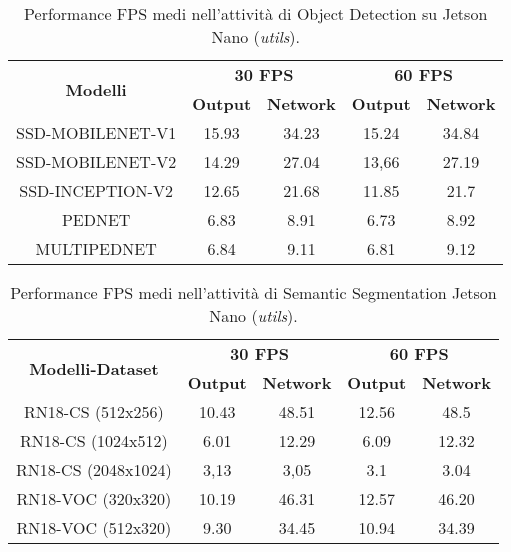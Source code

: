 \begin{table}
    \renewcommand{\baselinestretch}{1}
    \centering
    \begin{adjustbox}{max width=\textwidth}
    \begin{tabular}{|c||c|c||c|c||}
        \hline
        \multirow{2}{*}{\bfseries{\Large Modelli}} & \multicolumn{2}{c||}{\bfseries{30 FPS}} & \multicolumn{2}{c||}{\bfseries{60 FPS}}\\            & \bfseries{Output} & \bfseries{Network} & \bfseries{Output} & \bfseries{Network}\\
        \hline
        \hline
        SSD-MOBILENET-V1 & 15.93 & 34.23 & 15.24 & 34.84\\
        \hline
        SSD-MOBILENET-V2 & 14.29 & 27.04 & 13,66 & 27.19\\
        \hline 
        SSD-INCEPTION-V2 & 12.65 & 21.68 & 11.85 & 21.7\\
        \hline
        PEDNET & 6.83 &  8.91 & 6.73 & 8.92\\
        \hline
        MULTIPEDNET & 6.84 & 9.11 & 6.81 & 9.12\\
        \hline
    \end{tabular}
    \end{adjustbox}
    \vspace{0.5cm}
    \caption{Performance FPS medi nell'attività di Object Detection su Jetson Nano (\emph{utils}).}
    \label{average performance jetson utils obj_det}
\end{table}

\begin{table}
    \renewcommand{\baselinestretch}{1}
    \centering
    \begin{adjustbox}{max width=\textwidth}
    \begin{tabular}{|c||c|c||c|c||}
        \hline
        \multirow{2}{*}{\bfseries{\Large Modelli-Dataset}} & \multicolumn{2}{c||}{\bfseries{30 FPS}} & \multicolumn{2}{c||}{\bfseries{60 FPS}}\\            & \bfseries{Output} & \bfseries{Network} & \bfseries{Output} & \bfseries{Network}\\
        \hline
        \hline
        RN18-CS (512x256) & 10.43 & 48.51 & 12.56 & 48.5\\
        \hline
        RN18-CS (1024x512) & 6.01 & 12.29 & 6.09 & 12.32\\
        \hline 
        RN18-CS (2048x1024) & 3,13 & 3,05 & 3.1 & 3.04\\
        \hline
        RN18-VOC (320x320) & 10.19 &  46.31 & 12.57 & 46.20\\
        \hline
        RN18-VOC (512x320) & 9.30 & 34.45 & 10.94 & 34.39\\
        \hline
    \end{tabular}
    \end{adjustbox}
    \vspace{0.5cm}
    \caption{Performance FPS medi nell'attività di Semantic Segmentation Jetson Nano (\emph{utils}).}
    \label{average performance jetson utils sem_seg}
\end{table}

